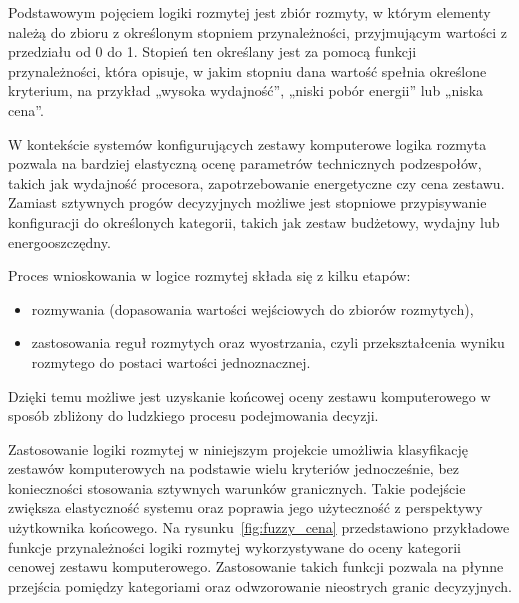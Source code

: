 \documentclass[a4paper,twoside,12pt]{book}
\begin{document}
Podstawowym pojęciem logiki rozmytej jest zbiór rozmyty, w którym elementy
należą do zbioru z określonym stopniem przynależności, przyjmującym wartości
z przedziału od 0 do 1. Stopień ten określany jest za pomocą funkcji
przynależności, która opisuje, w jakim stopniu dana wartość spełnia określone
kryterium, na przykład „wysoka wydajność”, „niski pobór energii” lub „niska
cena”.

W kontekście systemów konfigurujących zestawy komputerowe logika rozmyta
pozwala na bardziej elastyczną ocenę parametrów technicznych podzespołów,
takich jak wydajność procesora, zapotrzebowanie energetyczne czy cena zestawu.
Zamiast sztywnych progów decyzyjnych możliwe jest stopniowe przypisywanie
konfiguracji do określonych kategorii, takich jak zestaw budżetowy, wydajny
lub energooszczędny.

Proces wnioskowania w logice rozmytej składa się z kilku etapów:
\begin{itemize}
    \item rozmywania
(dopasowania wartości wejściowych do zbiorów rozmytych), 
    \item zastosowania reguł
rozmytych oraz wyostrzania, czyli przekształcenia wyniku rozmytego do postaci
wartości jednoznacznej. 
\end{itemize} Dzięki temu możliwe jest uzyskanie końcowej oceny
zestawu komputerowego w sposób zbliżony do ludzkiego procesu podejmowania
decyzji.

Zastosowanie logiki rozmytej w niniejszym projekcie umożliwia klasyfikację
zestawów komputerowych na podstawie wielu kryteriów jednocześnie, bez
konieczności stosowania sztywnych warunków granicznych. Takie podejście
zwiększa elastyczność systemu oraz poprawia jego użyteczność z perspektywy
użytkownika końcowego.
Na rysunku~\ref{fig:fuzzy_cena} przedstawiono przykładowe funkcje przynależności
logiki rozmytej wykorzystywane do oceny kategorii cenowej zestawu komputerowego.
Zastosowanie takich funkcji pozwala na płynne przejścia pomiędzy kategoriami
oraz odwzorowanie nieostrych granic decyzyjnych.
\end{document}
